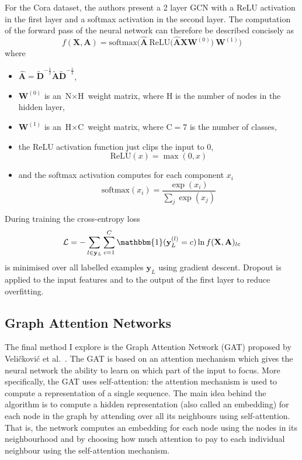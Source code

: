 \documentclass[12pt]{article}
\theoremstyle{definition}
\begin{document}
For the Cora dataset, the authors present a 2 layer GCN with a ReLU activation in the first layer and a softmax activation in the second layer. The computation of the forward pass of the neural network can therefore be described concisely as
\[
f(\mathbf{X},\mathbf{A}) = \textrm{softmax}\big(\hat{\mathbf{A}}\ \textrm{ReLU}\big( \hat{\mathbf{A}} \mathbf{X} \mathbf{W}^{(0)} \big)\ \mathbf{W}^{(1)} \big)
\]
where \begin{itemize}
	\item $\hat{\mathbf{A}} = \tilde{\mathbf{D}}^{-\frac{1}{2}} \tilde{\mathbf{A}} \tilde{\mathbf{D}}^{-\frac{1}{2}}$,
	\item $\mathbf{W}^{(0)}$ is an $\textrm{N} \times \textrm{H}$ weight matrix, where $\textrm{H}$ is the number of nodes in the hidden layer,
	\item $\mathbf{W}^{(1)}$ is an $\textrm{H} \times \textrm{C}$ weight matrix, where $\textrm{C} = 7$ is the number of classes,
	\item the ReLU activation function just clips the input to 0,
\[
\textrm{ReLU}(x) = \max(0, x)
\]
	\item and the softmax activation computes for each component $x_i$
\[
\textrm{softmax}(x_i) = \frac{\exp(x_i)}{\sum_j \exp(x_j)}
\]


\end{itemize} During training the cross-entropy loss 
\[
\mathcal{L} = - \sum_{l \in \mathbf{y}_L} \sum_{c=1}^{C} \mathbbm{1}(
\textbf{y}_{L}^{(l)} = c) \ln f(\mathbf{X},\mathbf{A})_{lc}
\]
is minimised over all labelled examples $\textbf{y}_L$ using gradient descent. Dropout \cite{srivastava2014dropout} is applied to the input features and to the output of the first layer to reduce overfitting.

\subsection{Graph Attention Networks}
The final method I explore is the Graph Attention Network (GAT) proposed by Veli{\v{c}}kovi{\'{c}} et al.\ \cite{velickovic2018graph}. The GAT is based on an attention mechanism which gives the neural network the ability to learn on which part of the input to focus. More specifically, the GAT uses self-attention: the attention mechanism is used to compute a representation of a single sequence. The main idea behind the algorithm is to compute a hidden representation (also called an embedding) for each node in the graph by attending over all its neighbours using self-attention. That is, the network computes an embedding for each node using the nodes in its neighbourhood and by choosing how much attention to pay to each individual neighbour using the self-attention mechanism.
\end{document}
